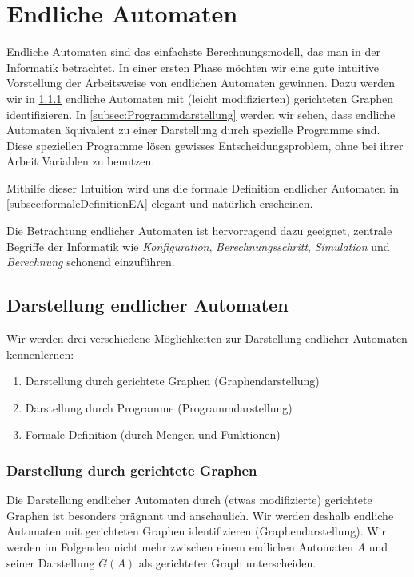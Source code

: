 \chapter{Endliche Automaten}
Endliche Automaten sind das einfachste Berechnungsmodell, das man in der Informatik
betrachtet. In einer ersten Phase möchten wir eine gute intuitive Vorstellung der Arbeitsweise von endlichen Automaten gewinnen. Dazu werden wir in \cref{subsec:graphenDarstellung} endliche Automaten mit (leicht modifizierten) gerichteten Graphen identifizieren. In \cref{subsec:Programmdarstellung} werden wir sehen, dass endliche Automaten äquivalent zu einer Darstellung durch spezielle Programme sind. Diese speziellen Programme lösen gewisses Entscheidungsproblem, ohne bei ihrer Arbeit Variablen zu benutzen.

Mithilfe dieser Intuition wird uns die formale Definition endlicher Automaten in \cref{subsec:formaleDefinitionEA} elegant und natürlich erscheinen.

Die Betrachtung endlicher Automaten ist hervorragend dazu geeignet, zentrale Begriffe der Informatik wie \textit{Konfiguration}, \textit{Berechnungsschritt}, \textit{Simulation} und \textit{Berechnung} schonend einzuführen.

\section{Darstellung endlicher Automaten}
Wir werden drei verschiedene Möglichkeiten zur Darstellung endlicher Automaten kennenlernen:
\begin{enumerate}
	\item Darstellung durch gerichtete Graphen (Graphendarstellung)
	\item Darstellung durch Programme (Programmdarstellung)
	\item Formale Definition (durch Mengen und Funktionen)
\end{enumerate}

\subsection{Darstellung durch gerichtete Graphen}\label{subsec:graphenDarstellung}
Die Darstellung endlicher Automaten durch (etwas modifizierte) gerichtete Graphen ist besonders prägnant und anschaulich. Wir werden deshalb endliche Automaten mit gerichteten Graphen identifizieren (Graphendarstellung). Wir werden im Folgenden nicht mehr zwischen einem endlichen Automaten $A$ und seiner Darstellung $G(A)$ als gerichteter Graph unterscheiden.

